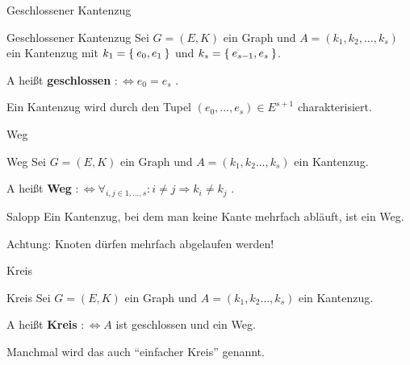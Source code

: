 \begin{frame}{Geschlossener Kantenzug}
\begin{block}{Geschlossener Kantenzug}
Sei $G = (E, K)$ ein Graph und $A = (k_1, k_2, \dots, k_s)$ ein Kantenzug
mit $k_1 = \Set{e_0, e_1}$ und $k_s = \Set{e_{s-1}, e_s}$.

A heißt \textbf{geschlossen} $:\Leftrightarrow e_0 = e_s$ .
\end{block}

Ein Kantenzug wird durch den Tupel $(e_0, \dots, e_s) \in E^{s+1}$ 
charakterisiert.

\begin{gallery}
\end{gallery}
\end{frame}

\begin{frame}{Weg}
\begin{block}{Weg}
Sei $G = (E, K)$ ein Graph und $A = (k_1, k_2 \dots, k_s)$ ein Kantenzug.

A heißt \textbf{Weg} $:\Leftrightarrow \forall_{i, j \in 1, \dots, s}: i \neq j \Rightarrow k_i \neq k_j$ .
\end{block}

\pause

\begin{exampleblock}{Salopp}
Ein Kantenzug, bei dem man keine Kante mehrfach abläuft, ist ein Weg.
\end{exampleblock}

\pause

Achtung: Knoten dürfen mehrfach abgelaufen werden!
\end{frame}

\begin{frame}{Kreis}
\begin{block}{Kreis}
Sei $G = (E, K)$ ein Graph und $A = (k_1, k_2 \dots, k_s)$ ein Kantenzug.

A heißt \textbf{Kreis} $:\Leftrightarrow A$ ist geschlossen und ein Weg.
\end{block}

\pause

Manchmal wird das auch "`einfacher Kreis"' genannt.

\pause

\begin{gallery}
\end{gallery}
\end{frame}

